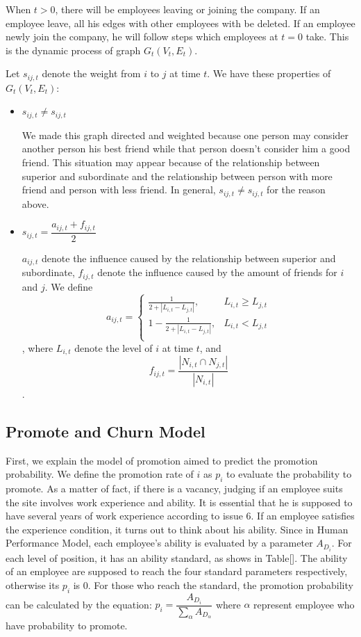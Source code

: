 \documentclass[12pt,a4paper,titlepage]{article}
\begin{document}
When $t > 0$, there will be employees leaving or joining the
company. If an employee leave, all his edges with other employees with
be deleted. If an employee newly join the company, he will follow
steps which employees at $t = 0$ take. This is the dynamic process of
graph $G_t(V_t,E_t)$.

Let $s_{ij,t}$ denote the weight from $i$ to $j$ at time $t$. We have
these properties of $G_t(V_t,E_t)$:

\begin{itemize}
\item $s_{ij,t} \ne s_{ij,t}$

  We made this graph directed and weighted because one person may
  consider another person his best friend while that person doesn't
  consider him a good friend. This situation may appear because of the
  relationship between superior and subordinate and the relationship
  between person with more friend and person with less friend. In
  general, $s_{ij,t} \ne s_{ij,t}$ for the reason above.

\item $s_{ij,t}=\dfrac{a_{ij,t}+f_{ij,t}}{2}$

  $a_{ij,t}$ denote the influence caused by the relationship between
  superior and subordinate, $f_{ij,t}$ denote the influence caused by
  the amount of friends for $i$ and $j$. We define
$$a_{ij,t}=\begin{cases}
  \frac{1}{2+\left|L_{i,t}-L_{j,t}\right|}, & L_{i,t} \ge L_{j,t} \\
  1-\frac{1}{2+\left|L_{i,t}-L_{j,t}\right|}, & L_{i,t} < L_{j,t} \\
\end{cases}$$
, where $L_{i,t}$ denote the level of $i$ at time $t$, and
$$f_{ij,t}=\frac{\left|N_{i,t} \cap
    N_{j,t}\right|}{\left|N_{i,t}\right|}$$.

\end{itemize}

\subsection{Promote and Churn Model}
\label{sec:promote-and-churn-model}

First, we explain the model of promotion aimed to predict the
promotion probability. We define the promotion rate of $i$ as
$p_i$ to evaluate the probability to promote. As a matter of fact, if
there is a vacancy, judging if an employee suits the site involves
work experience and ability. It is essential that he is supposed to
have several years of work experience according to issue 6. If an
employee satisfies the experience condition, it turns out to think
about his ability. Since in Human Performance Model, each employee's
ability is evaluated by a parameter $A_{D_i}$. For each level of
position, it has an ability standard, as shows in Table[]. The ability
of an employee are supposed to reach the four standard parameters
respectively, otherwise its $p_i$ is 0. For those who reach the
standard, the promotion probability can be calculated by the equation:
$p_i =\dfrac{A_{D_i}}{\sum_{\alpha} A_{D_\alpha}}$ where $\alpha$ represent
employee who have probability to promote.
\end{document}
